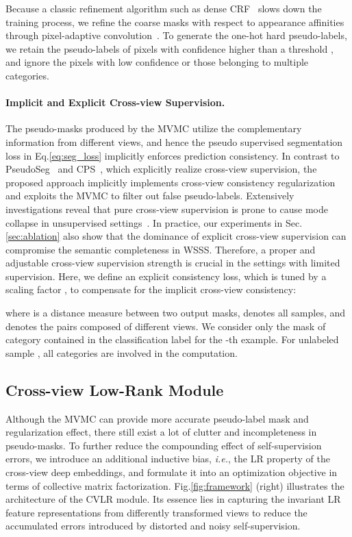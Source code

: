 \documentclass[twocolumn]{svjour3}          \smartqed  \usepackage{graphicx}
\makeatletter
\newcommand{\Eq}{Eq.\@\xspace}
\newcommand{\Fig}{Fig.\@\xspace}
\newcommand{\Sec}{Sec.\@\xspace}
\newcommand{\prelim}[1]{{#1}}
\makeatother
\begin{document}
Because a classic refinement algorithm such as dense CRF~\citep{KrahenbuhlK11:CRF} slows down the training process, we refine the coarse masks with respect to appearance affinities through pixel-adaptive convolution~\citep{su2019:PAC,Araslanov020:SingleStage}.
To generate the one-hot hard pseudo-labels, we retain the pseudo-labels of pixels with confidence higher than a threshold , and ignore the pixels with low confidence or those belonging to multiple categories.

\paragraph{Implicit and Explicit Cross-view Supervision.}
The pseudo-masks produced by the MVMC utilize the complementary information from different views, and hence the pseudo supervised segmentation loss in \Eq\ref{eq:seg_loss} implicitly enforces prediction consistency.
In contrast to PseudoSeg~\citep{zou2020:pseudoseg} and CPS~\citep{Chen2021:CrossPseudo}, which explicitly realize cross-view supervision, the proposed approach implicitly implements cross-view consistency regularization and exploits the MVMC to filter out false pseudo-labels.
Extensively investigations reveal that pure cross-view supervision is prone to cause mode collapse in unsupervised settings~\citep{Xinlei:SimSiam,ChenK0H20:SimCLR}.
In practice, our experiments in \Sec\ref{sec:ablation} also show that the dominance of explicit cross-view supervision can compromise the semantic completeness in WSSS.
Therefore, a proper and adjustable cross-view supervision strength is crucial in the settings with limited supervision.
Here, we define an explicit consistency loss, which is tuned by a scaling factor , to compensate for the implicit cross-view consistency:

where  is a distance measure between two output masks,  denotes all samples, and  denotes the pairs composed of different views. We consider only the mask of category  contained in the classification label  for the -th example. 
For unlabeled sample , all categories are involved in the computation.
\subsection{Cross-view Low-Rank Module}
\label{sec:cross_view_lowrank}

\prelim{Although the MVMC can provide more accurate pseudo-label mask and regularization effect, there still exist a lot of clutter and incompleteness in pseudo-masks. To further reduce the compounding effect of self-supervision errors, we introduce an additional inductive bias, \textit{i.e.}, the LR property of the cross-view deep embeddings, and formulate it into an optimization objective in terms of collective matrix factorization.
\Fig\ref{fig:framework} (right) illustrates the architecture of the CVLR module.
Its essence lies in capturing the invariant LR feature representations from differently transformed views to reduce the accumulated errors introduced by distorted and noisy self-supervision.
}
\end{document}
